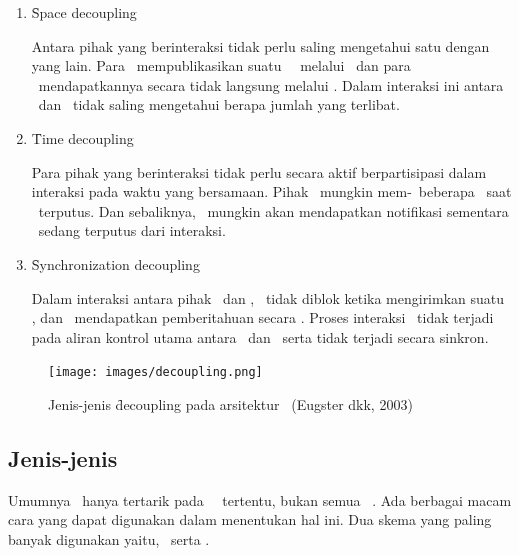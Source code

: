 \begin{enumerate}[noitemsep,nolistsep,leftmargin=0cm,itemindent=.5cm,listparindent=\parindent]
    \item \f{Space decoupling}

    Antara pihak yang berinteraksi tidak perlu saling mengetahui satu dengan
    yang lain. Para \publisher~mempublikasikan suatu \event~\pubsub~melalui
    \eventservice~dan para \subscriber~mendapatkannya secara tidak langsung
    melalui \eventservice.  Dalam interaksi ini antara \publisher~dan
    \subscriber~tidak saling mengetahui berapa jumlah yang terlibat.  \item \f{Time
    decoupling}

    Para pihak yang berinteraksi tidak perlu secara aktif berpartisipasi dalam
    interaksi pada waktu yang bersamaan. Pihak \publisher~mungkin
    mem-\publish~beberapa \event~saat \subscriber~terputus. Dan sebaliknya,
    \subscriber~mungkin akan mendapatkan notifikasi sementara \publisher~sedang
    terputus dari interaksi.  \item \f{Synchronization decoupling}

    Dalam interaksi antara pihak \publisher~dan \subscriber, \publisher~tidak diblok
    ketika mengirimkan suatu \event, dan \subscriber~mendapatkan pemberitahuan secara
    \asynch. Proses interaksi \event~tidak terjadi pada aliran kontrol utama antara
    \publisher~dan \subscriber~serta tidak terjadi secara sinkron.
\end{enumerate}
\begin{figure}
    \centering
    \texttt{[image: images/decoupling.png]}
    \caption{Jenis-jenis \f{decoupling} pada arsitektur \pubsub~(Eugster dkk, 2003)}
    \label{fig:decoupling}
\end{figure}

\subsection{Jenis-jenis \PubSub}
Umumnya \subscriber~hanya tertarik pada \event~\pubsub~tertentu, bukan semua \event~\pubsub.
Ada berbagai macam cara yang dapat digunakan dalam menentukan hal ini.
Dua skema yang paling banyak digunakan yaitu, \topicbased~serta \contentbased.


